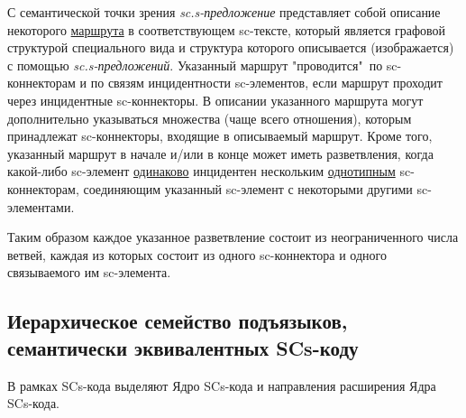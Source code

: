 \begin{SCn}
\end{SCn}

С семантической точки зрения \textit{sc.s-предложение} представляет собой описание некоторого \uline{маршрута} в соответствующем sc-тексте, который является графовой структурой специального вида и структура которого описывается (изображается) с помощью \textit{sc.s-предложений}. Указанный маршрут "проводится"\ по sc-коннекторам и по связям инцидентности sc-элементов, если маршрут проходит через инцидентные sc-коннекторы. В описании указанного маршрута могут дополнительно указываться множества (чаще всего отношения), которым принадлежат sc-коннекторы, входящие в описываемый маршрут. Кроме того, указанный маршрут в начале и/или в конце может иметь разветвления, когда какой-либо sc-элемент \uline{одинаково} инцидентен нескольким \uline{однотипным} sc-коннекторам, соединяющим указанный sc-элемент с некоторыми другими sc-элементами.

Таким образом каждое указанное разветвление состоит из неограниченного числа ветвей, каждая из которых состоит из одного sc-коннектора и одного связываемого им sc-элемента.


\subsection{Иерархическое семейство подъязыков, семантически эквивалентных SCs-коду}

В рамках SCs-кода выделяют Ядро SCs-кода и направления расширения Ядра SCs-кода.

\begin{SCn}
\end{SCn}

